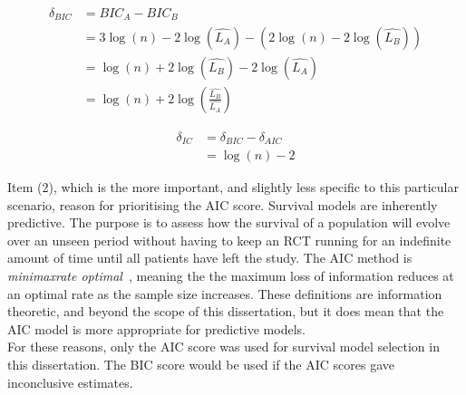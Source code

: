 \begin{align}
    \delta_{BIC} &= BIC_A - BIC_B \label{eq:bicdiff1}\\
           &= 3\log(n) - 2\log(\hat{L_A}) - (2\log(n) - 2\log(\hat{L_B})) \\
           &= \log(n) + 2\log(\hat{L_B}) - 2\log(\hat{L_A}) \\
           &= \log(n) + 2\log\left(\frac{\hat{L_B}}{\hat{L_A}}\right) \label{eq:bicdiff3}
\end{align}

\begin{align}
    \delta_{IC} &= \delta_{BIC} - \delta_{AIC} \\
                &= \log(n) - 2 \label{eq:dicDiff}
\end{align}

Item (2), which is the more important, and slightly less specific to this particular scenario, reason for prioritising the AIC score. Survival models are inherently predictive. The purpose is to assess how the survival of a population will evolve over an unseen period without having to keep an RCT running for an indefinite amount of time until all patients have left the study. The AIC method is \textit{minimax\-rate optimal}~\cite{ding}, meaning the the maximum loss of information reduces at an optimal rate as the sample size increases. These definitions are information theoretic, and beyond the scope of this dissertation, but it does mean that the AIC model is more appropriate for predictive models. \\

For these reasons, only the AIC score was used for survival model selection in this dissertation. The BIC score would be used if the AIC scores gave inconclusive estimates. 